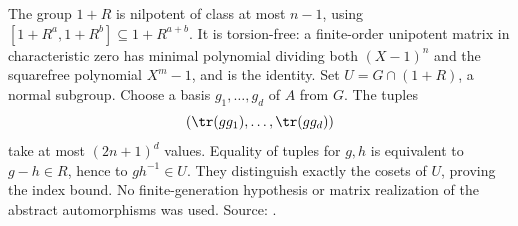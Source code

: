 The group \(1+R\) is nilpotent of class at most \(n-1\),
using \([1+R^a,1+R^b]\subseteq1+R^{a+b}\).
It is torsion-free: a finite-order unipotent matrix
in characteristic zero has minimal polynomial
dividing both \((X-1)^n\) and the squarefree
polynomial \(X^m-1\), and is the identity.
Set \(U=G\cap(1+R)\), a normal subgroup.
Choose a basis \(g_1,\ldots,g_d\) of \(A\) from \(G\).
The tuples
\[
 (\tr(gg_1),\ldots,\tr(gg_d))
\]
take at most \((2n+1)^d\) values. Equality of tuples
for \(g,h\) is equivalent to \(g-h\in R\), hence
to \(gh^{-1}\in U\). They distinguish exactly the
cosets of \(U\), proving the index bound.
No finite-generation hypothesis or matrix realization
of the abstract automorphisms was used. Source:
.

